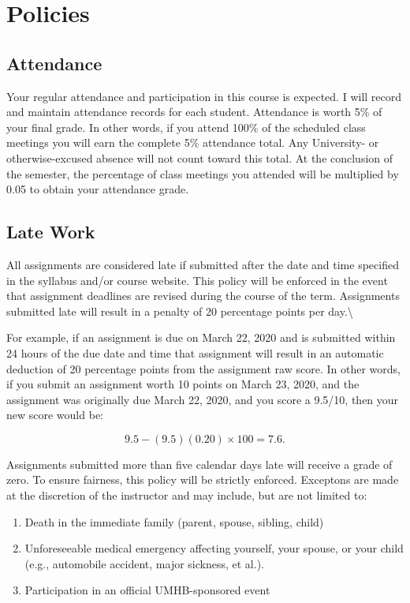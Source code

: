 \documentclass[
]{article}
\providecommand{\tightlist}{%
  \setlength{\itemsep}{0pt}\setlength{\parskip}{0pt}}
\begin{document}
\section{Policies}

\subsection{Attendance}

Your regular attendance and participation in this course is expected. I
will record and maintain attendance records for each student. Attendance
is worth 5\% of your final grade. In other words, if you attend 100\% of
the scheduled class meetings you will earn the complete 5\% attendance
total. Any University- or otherwise-excused absence will not count
toward this total. At the conclusion of the semester, the percentage of
class meetings you attended will be multiplied by 0.05 to obtain your
attendance grade.

\subsection{Late Work}

All assignments are considered late if submitted after the date and time
specified in the syllabus and/or course website. This policy will be
enforced in the event that assignment deadlines are revised during the
course of the term. Assignments submitted late will result in a penalty
of 20 percentage points per day.\textbackslash{}

For example, if an assignment is due on March 22, 2020 and is submitted
within 24 hours of the due date and time that assignment will result in
an automatic deduction of 20 percentage points from the assignment raw
score. In other words, if you submit an assignment worth 10 points on
March 23, 2020, and the assignment was originally due March 22, 2020,
and you score a 9.5/10, then your new score would be:

\begin{equation}
9.5 - (9.5)(0.20) \times 100 = 7.6.
\end{equation}

Assignments submitted more than five calendar days late will receive a
grade of zero. To ensure fairness, this policy will be strictly
enforced. Exceptons are made at the discretion of the instructor and may
include, but are not limited to:

\begin{enumerate}
\def\labelenumi{\arabic{enumi}.}
\tightlist
\item
  Death in the immediate family (parent, spouse, sibling, child)
\item
  Unforeseeable medical emergency affecting yourself, your spouse, or
  your child (e.g., automobile accident, major sickness, et al.).
\item
  Participation in an official UMHB-sponsored event
\end{enumerate}
\end{document}
